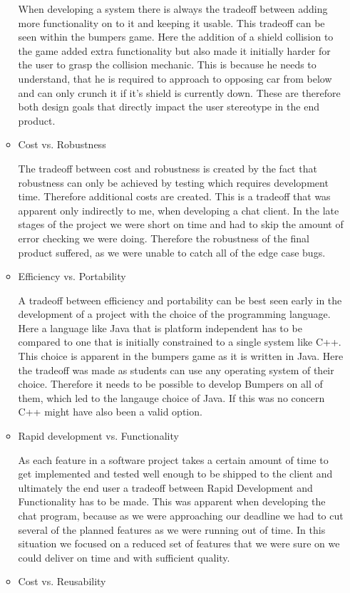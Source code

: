 \documentclass[a4paper, 10pt]{article}
\begin{document}
\begin{enumerate}
\begin{itemize}
        When developing a system there is always the tradeoff between adding more functionality on to it 
        and keeping it usable.
        This tradeoff can be seen within the bumpers game. Here the addition of a shield collision to the 
        game added extra functionality but also made it initially harder for the user to grasp the collision mechanic.
        This is because he needs to understand, that he is required to approach to opposing car from below and 
        can only crunch it if it's shield is currently down.
        These are therefore both design goals that directly impact the user stereotype in the end product.
        \item Cost vs. Robustness

        The tradeoff between cost and robustness is created by the fact that robustness can only be achieved by 
        testing which requires development time. Therefore additional costs are created. 
        This is a tradeoff that was apparent only indirectly to me, when developing a chat client. In the late stages of 
        the project we were short on time and had to skip the amount of error checking we were doing. Therefore the 
        robustness of the final product suffered, as we were unable to catch all of the edge case bugs.
        \item Efficiency vs. Portability

        A tradeoff between efficiency and portability can be best seen early in the development of a project with the 
        choice of the programming language. Here a language like Java that is platform independent has to be compared to 
        one that is initially constrained to a single system like C++. 
        This choice is apparent in the bumpers game as it is written in Java. Here the tradeoff was made as students can 
        use any operating system of their choice. Therefore it needs to be possible to develop Bumpers on all of them,
        which led to the langauge choice of Java. If this was no concern C++ might have also been a valid option.
        \item Rapid development vs. Functionality

        As each feature in a software project takes a certain amount of time to get implemented and tested well enough 
        to be shipped to the client and ultimately the end user a tradeoff between Rapid Development and Functionality has to
        be made.
        This was apparent when developing the chat program, because as we were approaching our deadline we had to cut 
        several of the planned features as we were running out of time. In this situation we focused on a reduced set of features 
        that we were sure on we could deliver on time and with sufficient quality. 
        \item Cost vs. Reusability


\end{itemize}
\end{enumerate}
\end{document}
